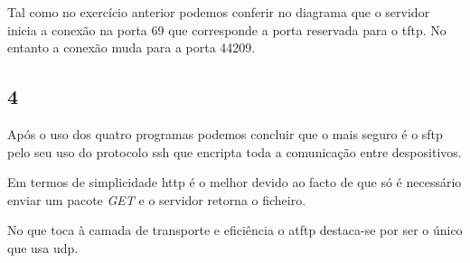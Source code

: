 \documentclass{article}
\begin{document}
                Tal como no exercício anterior podemos conferir no diagrama que o servidor inicia a conexão na porta 69 que corresponde a porta reservada para o tftp. No entanto a conexão muda para a porta 44209.
        \subsection*{4}
                Após o uso dos quatro programas podemos concluir que o mais seguro é o sftp pelo seu uso do protocolo ssh que encripta toda a comunicação entre despositivos.

                Em termos de simplicidade http é o melhor devido ao facto de que só é necessário enviar um pacote \textit{GET} e o servidor retorna o ficheiro.

                No que toca à camada de transporte e eficiência o atftp destaca-se por ser o único que usa udp.
\end{document}
